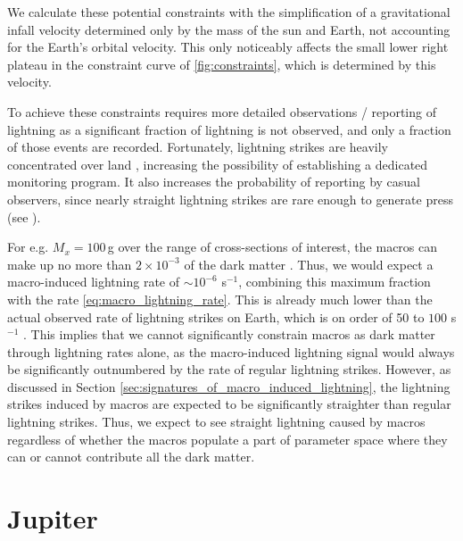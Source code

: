 \documentclass[%
 reprint,
 amsmath,amssymb,
 aps,
]{revtex4-2}
\begin{document}
        We calculate these potential constraints with the simplification of a gravitational infall velocity determined only by the mass of the sun and Earth, not accounting for the Earth's orbital velocity. This only noticeably affects the small lower right plateau in the constraint curve of \ref{fig:constraints}, which is determined by this velocity.

        To achieve these constraints requires more detailed observations / reporting of lightning as a significant fraction of lightning is not observed, and only a fraction of those events are recorded. Fortunately, lightning strikes are heavily concentrated over land \citep{Christian2003},  increasing the possibility of establishing a dedicated monitoring program.  It also increases the probability of reporting by casual observers, since nearly straight lightning strikes are rare enough to generate press (see \cite{Zimbabwe}).

        For e.g. $M_x = 100\,$g over the range of cross-sections of interest, the macros can make up no more than $2\times 10^{-3}$ of the dark matter \cite{Sidhu2019death}. Thus, we would expect a macro-induced lightning rate of $\sim 10^{-6}$ s$^{-1}$, combining this maximum fraction with the rate \eqref{eq:macro_lightning_rate}. This is already much lower than the actual observed rate of lightning strikes on Earth, which is on order of 50 to $100$ s$^{-1}$ \citep{Mackerras1998}. This implies that we cannot significantly constrain macros as dark matter through lightning rates alone, as the macro-induced lightning signal would always be significantly outnumbered by the rate of regular lightning strikes. However, as discussed in Section \ref{sec:signatures_of_macro_induced_lightning}, the lightning strikes induced by macros are expected to be significantly straighter than regular lightning strikes. Thus, we expect to see straight lightning caused by macros regardless of whether the macros populate a part of parameter space where they can or cannot contribute all the dark matter.

    


\section{Jupiter} %
\label{sec:jovian_bolides}
\end{document}
